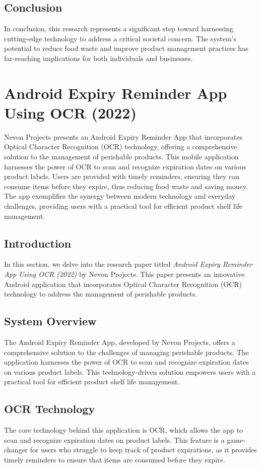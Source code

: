 \subsection{Conclusion}
In conclusion, this research represents a significant step toward harnessing cutting-edge technology to address a critical societal concern. The system's potential to reduce food waste and improve product management practices has far-reaching implications for both individuals and businesses.




\section{Android Expiry Reminder App Using OCR (2022)}
Nevon Projects presents an Android Expiry Reminder App that incorporates Optical Character Recognition (OCR) technology, offering a comprehensive solution to the management of perishable products. This mobile application harnesses the power of OCR to scan and recognize expiration dates on various product labels. Users are provided with timely reminders, ensuring they can consume items before they expire, thus reducing food waste and saving money. The app exemplifies the synergy between modern technology and everyday challenges, providing users with a practical tool for efficient product shelf life management.

\subsection{Introduction}
In this section, we delve into the research paper titled \textit{Android Expiry Reminder App Using OCR (2022)} by Nevon Projects. This paper presents an innovative Android application that incorporates Optical Character Recognition (OCR) technology to address the management of perishable products.

\subsection{System Overview}
The Android Expiry Reminder App, developed by Nevon Projects, offers a comprehensive solution to the challenges of managing perishable products. The application harnesses the power of OCR to scan and recognize expiration dates on various product labels. This technology-driven solution empowers users with a practical tool for efficient product shelf life management.

\subsection{OCR Technology}
The core technology behind this application is OCR, which allows the app to scan and recognize expiration dates on product labels. This feature is a game-changer for users who struggle to keep track of product expirations, as it provides timely reminders to ensure that items are consumed before they expire.

